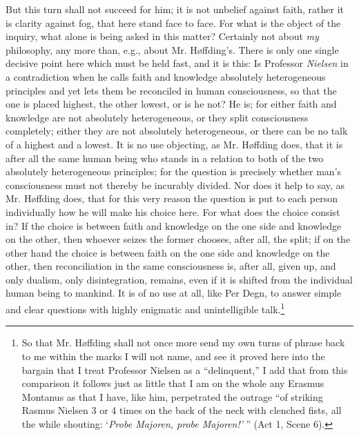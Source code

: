 \documentclass[12pt,a4paper,openany]{book}
\renewcommand{\thefootnote}{*)}
\newcommand{\fnmark}[2]{\renewcommand{\thefootnote}{#1}\footnote{#2}%
  \renewcommand{\thefootnote}{*)}}
\newcommand{\opage}[1]{\marginnote{\footnotesize\textit{[#1]}}}
\begin{document}
But this turn shall not succeed for him; it is not unbelief
against faith, rather it is clarity against fog, that here stand face
to face. For what is the object of the inquiry, what alone is
being asked in this matter? Certainly not about \emph{my}
philosophy, any more than, e.g., about Mr. Høffding's. There is only one
single decisive point here which must be held fast, and
it is this: Is Professor \emph{Nielsen} in a contradiction when he
calls faith and knowledge absolutely heterogeneous principles and yet lets
them be reconciled in human consciousness, so that the
one is placed highest, the other lowest, or is he not? He
is; for either faith and knowledge are not absolutely heterogeneous, or
they split consciousness completely; either they are not absolutely
heterogeneous, or there can be no talk of a highest and a lowest. It
\opage{18}is no use objecting, as Mr. Høffding does, that it is after all the
same human being who stands in a relation to both of the two absolutely
heterogeneous principles; for the question is precisely whether
man's consciousness must not thereby be incurably divided. Nor does it
help to say, as Mr. Høffding does, that for this very reason the
question is put to each person individually how he will make
his choice here. For what does the choice consist in? If the choice is between
faith and knowledge on the one side and knowledge on the other,
then whoever seizes the former chooses, after all, the split; if on the
other hand the choice is between faith on the one side and knowledge on
the other, then reconciliation in the same consciousness is, after all,
given up, and only dualism, only disintegration, remains, even if it
is shifted from the individual human being to mankind. It is
of no use at all, like Per Degn, to answer simple and clear
questions with highly enigmatic and unintelligible talk.\fnmark{*)}{So that Mr. Høffding shall not once more send my own turns of phrase
back to me within the marks I will not name, and see it proved here into
the bargain that I treat Professor Nielsen as a ``delinquent,'' I add that from this
comparison it follows just as little that I am on the whole any Erasmus
Montanus as that I have, like him, perpetrated the outrage ``of striking Rasmus
Nielsen 3 or 4 times on the back of the neck with clenched fists, all the while shouting:
`\emph{Probe Majoren, probe Majoren!}\,'\,'' (Act 1, Scene 6).}
\end{document}

